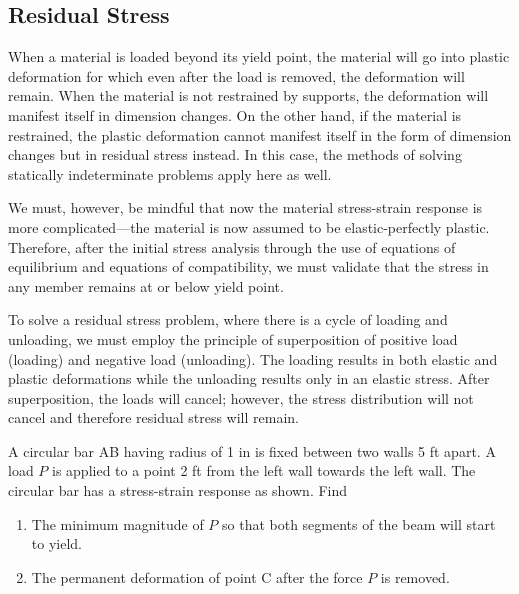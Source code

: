 \documentclass[
10pt,
a4paper,
openany,
svgnames,
]{book} %
\begin{document}
\subsection{Residual Stress}

When a material is loaded beyond its yield point, the material will go into plastic deformation for which even after the load is removed, the deformation will remain. When the material is not restrained by supports, the deformation will manifest itself in dimension changes. On the other hand, if the material is restrained, the plastic deformation cannot manifest itself in the form of dimension changes but in residual stress instead. In this case, the methods of solving statically indeterminate problems apply here as well.

We must, however, be mindful that now the material stress-strain response is more complicated—the material is now assumed to be elastic-perfectly plastic. Therefore, after the initial stress analysis through the use of equations of equilibrium and equations of compatibility, we must validate that the stress in any member remains at or below yield point.

To solve a residual stress problem, where there is a cycle of loading and unloading, we must employ the principle of superposition of positive load (loading) and negative load (unloading). The loading results in both elastic and plastic deformations while the unloading results only in an elastic stress. After superposition, the loads will cancel; however, the stress distribution will not cancel and therefore residual stress will remain.

\begin{example}

  A circular bar AB having radius of 1 in is fixed between two walls 5 ft apart. A load $P$ is applied to a point 2 ft from the left wall towards the left wall. The circular bar has a stress-strain response as shown. Find
  \begin{enumerate}
  \item The minimum magnitude of $P$ so that both segments of the beam will start to yield.
  \item The permanent deformation of point C after the force $P$ is removed.
  \end{enumerate}

\end{example}
\end{document}
